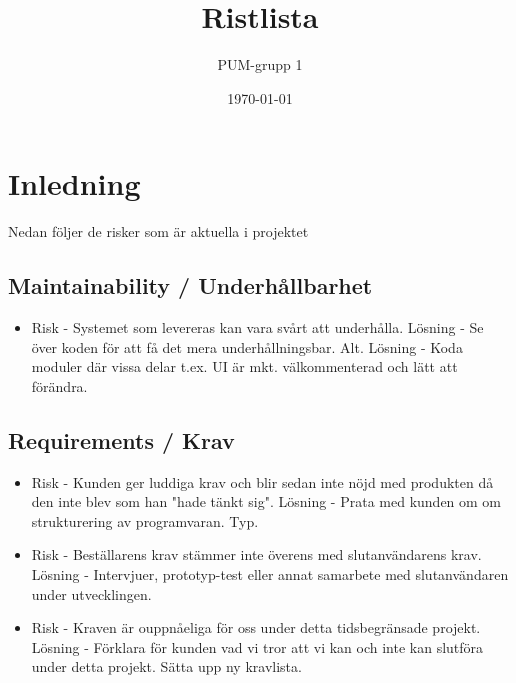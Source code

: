 

\ifpdf
\else
\fi

\title{Ristlista}
\author{PUM-grupp 1}
\date{\today}



\maketitle\thispagestyle{empty}

\newpage

\setcounter{tocdepth}{2}
\tableofcontents
\newpage

\section{Inledning}
Nedan följer de risker som är aktuella i projektet

\subsection{Maintainability / Underhållbarhet}
\begin{itemize}
\item Risk - Systemet som levereras kan vara svårt att underhålla.
Lösning - Se över koden för att få det mera underhållningsbar.
Alt. Lösning - Koda moduler där vissa delar t.ex. UI är mkt. välkommenterad och lätt att förändra.
\end{itemize}

\subsection{Requirements / Krav}
\begin{itemize}
\item Risk - Kunden ger luddiga krav och blir sedan inte nöjd med produkten då den inte blev som han "hade tänkt sig".
Lösning - Prata med kunden om om strukturering av programvaran. Typ.
\item Risk - Beställarens krav stämmer inte överens med slutanvändarens krav.
Lösning - Intervjuer, prototyp-test eller annat samarbete med slutanvändaren under utvecklingen.
\item Risk - Kraven är ouppnåeliga för oss under detta tidsbegränsade projekt.
Lösning - Förklara för kunden vad vi tror att vi kan och inte kan slutföra under detta projekt. Sätta upp ny kravlista.
\end{itemize}

